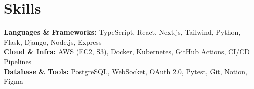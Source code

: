 \section{Skills}

\begin{onecolentry}
    \textbf{Languages \& Frameworks:} TypeScript, React, Next.js, Tailwind, Python, Flask, Django, Node.js, Express \\[0.2cm]
    \textbf{Cloud \& Infra:} AWS (EC2, S3), Docker, Kubernetes, GitHub Actions, CI/CD Pipelines \\[0.2cm]
    \textbf{Database \& Tools:} PostgreSQL, WebSocket, OAuth 2.0, Pytest, Git, Notion, Figma
\end{onecolentry}
